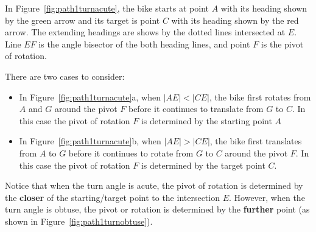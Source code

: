 \documentclass{article}
\begin{document}
In Figure~\ref{fig:path1turnacute}, the bike starts at point $A$ with its heading shown by
the green arrow and its target is point $C$ with its heading shown by the red arrow.
The extending headings are shows by the dotted lines intersected at $E$.
Line $EF$ is the angle bisector of the both heading lines, and point $F$ is the
pivot of rotation.

There are two cases to consider:
\begin{itemize}
  \item In Figure~\ref{fig:path1turnacute}a, when $|AE| < |CE|$, the bike first rotates from $A$ and $G$ around the 
  pivot $F$  before it continues to translate from $G$ to $C$. In this case the pivot of rotation $F$ is determined
  by the starting point $A$
  \item In Figure~\ref{fig:path1turnacute}b, when $|AE| > |CE|$, the bike first translates from $A$ to $G$ before it 
  continues to rotate from $G$ to $C$ around the pivot $F$. In this case the pivot of rotation $F$ is determined
  by the target point $C$.
\end{itemize}
Notice that when the turn angle is acute, the pivot of rotation is determined by the \textbf{closer} 
of the starting/target point to the intersection $E$.
However, when the turn angle is obtuse, the pivot or rotation is determined by the \textbf{further}
point (as shown in Figure~\ref{fig:path1turnobtuse}).
\end{document}
